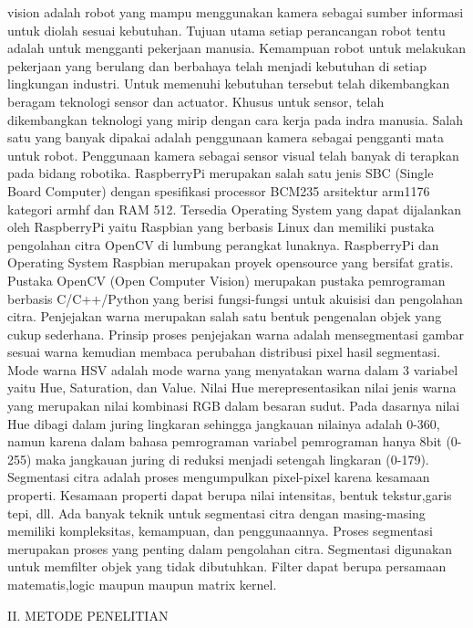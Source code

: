 \documentclass[10pt,journal,compsoc]{IEEEtran}
\begin{document}
   vision adalah robot yang mampu menggunakan kamera sebagai sumber informasi untuk diolah sesuai kebutuhan. 
  Tujuan utama setiap perancangan robot tentu adalah untuk mengganti pekerjaan manusia. 
  Kemampuan robot untuk melakukan pekerjaan yang berulang dan berbahaya telah menjadi kebutuhan di setiap lingkungan industri.
  Untuk memenuhi kebutuhan tersebut telah dikembangkan beragam teknologi sensor dan actuator. 
  Khusus untuk sensor, telah dikembangkan teknologi yang mirip dengan cara kerja pada indra manusia. 
  Salah satu yang banyak dipakai adalah penggunaan kamera sebagai pengganti mata untuk robot.
  Penggunaan kamera sebagai sensor visual telah banyak di terapkan pada bidang robotika.
  RaspberryPi merupakan salah satu jenis SBC (Single Board Computer) dengan spesifikasi processor BCM235 arsitektur arm1176 kategori armhf dan RAM 512. 
  Tersedia Operating System yang dapat dijalankan oleh RaspberryPi yaitu Raspbian yang berbasis Linux dan memiliki pustaka pengolahan citra OpenCV di lumbung perangkat lunaknya. 
  RaspberryPi dan Operating System Raspbian merupakan proyek opensource yang bersifat gratis.
  Pustaka OpenCV (Open Computer Vision) merupakan pustaka pemrograman berbasis C/C++/Python yang berisi fungsi-fungsi untuk akuisisi dan pengolahan citra.
  Penjejakan warna merupakan salah satu bentuk pengenalan objek yang cukup sederhana. 
  Prinsip proses penjejakan warna adalah mensegmentasi gambar sesuai warna kemudian membaca perubahan distribusi pixel hasil segmentasi.
  Mode warna HSV adalah mode warna yang menyatakan warna dalam 3 variabel yaitu Hue, Saturation, dan Value.
  Nilai Hue merepresentasikan nilai jenis warna yang merupakan nilai kombinasi RGB dalam besaran sudut. 
  Pada dasarnya nilai Hue dibagi dalam juring lingkaran sehingga jangkauan nilainya adalah 0-360, 
  namun karena dalam bahasa pemrograman variabel pemrograman hanya 8bit (0-255) maka jangkauan juring di reduksi menjadi setengah lingkaran (0-179).
  Segmentasi citra adalah proses mengumpulkan pixel-pixel karena kesamaan properti. 
  Kesamaan properti dapat berupa nilai intensitas, bentuk tekstur,garis tepi, dll. 
  Ada banyak teknik untuk segmentasi citra dengan masing-masing memiliki kompleksitas, kemampuan, dan penggunaannya.
  Proses segmentasi merupakan proses yang penting dalam pengolahan citra.
  Segmentasi digunakan untuk memfilter objek yang tidak dibutuhkan. 
  Filter dapat berupa persamaan matematis,logic maupun maupun matrix kernel.
  
  \begin{center}
     II. METODE PENELITIAN
  \end{center}
  
\end{document}

